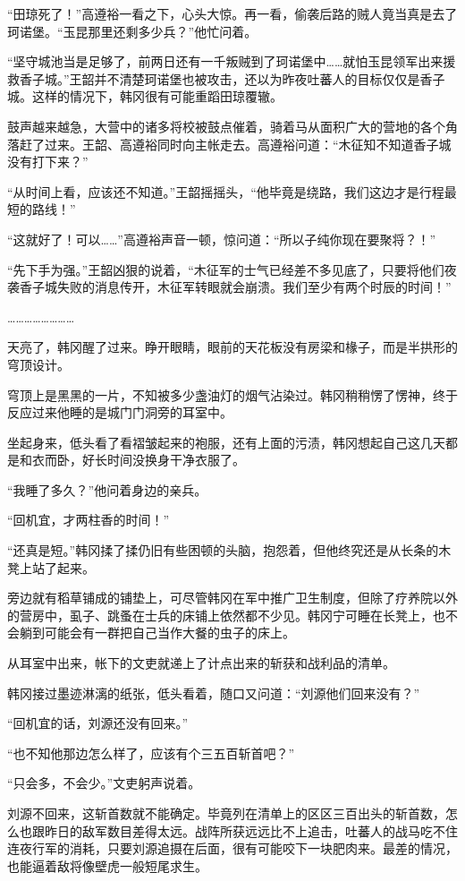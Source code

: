 “田琼死了！”高遵裕一看之下，心头大惊。再一看，偷袭后路的贼人竟当真是去了珂诺堡。“玉昆那里还剩多少兵？”他忙问着。

“坚守城池当是足够了，前两日还有一千叛贼到了珂诺堡中……就怕玉昆领军出来援救香子城。”王韶并不清楚珂诺堡也被攻击，还以为昨夜吐蕃人的目标仅仅是香子城。这样的情况下，韩冈很有可能重蹈田琼覆辙。

鼓声越来越急，大营中的诸多将校被鼓点催着，骑着马从面积广大的营地的各个角落赶了过来。王韶、高遵裕同时向主帐走去。高遵裕问道：“木征知不知道香子城没有打下来？”

“从时间上看，应该还不知道。”王韶摇摇头，“他毕竟是绕路，我们这边才是行程最短的路线！”

“这就好了！可以……”高遵裕声音一顿，惊问道：“所以子纯你现在要聚将？！”

“先下手为强。”王韶凶狠的说着，“木征军的士气已经差不多见底了，只要将他们夜袭香子城失败的消息传开，木征军转眼就会崩溃。我们至少有两个时辰的时间！”

……………………

天亮了，韩冈醒了过来。睁开眼睛，眼前的天花板没有房梁和椽子，而是半拱形的穹顶设计。

穹顶上是黑黑的一片，不知被多少盏油灯的烟气沾染过。韩冈稍稍愣了愣神，终于反应过来他睡的是城门门洞旁的耳室中。

坐起身来，低头看了看褶皱起来的袍服，还有上面的污渍，韩冈想起自己这几天都是和衣而卧，好长时间没换身干净衣服了。

“我睡了多久？”他问着身边的亲兵。

“回机宜，才两柱香的时间！”

“还真是短。”韩冈揉了揉仍旧有些困顿的头脑，抱怨着，但他终究还是从长条的木凳上站了起来。

旁边就有稻草铺成的铺垫上，可尽管韩冈在军中推广卫生制度，但除了疗养院以外的营房中，虱子、跳蚤在士兵的床铺上依然都不少见。韩冈宁可睡在长凳上，也不会躺到可能会有一群把自己当作大餐的虫子的床上。

从耳室中出来，帐下的文吏就递上了计点出来的斩获和战利品的清单。

韩冈接过墨迹淋漓的纸张，低头看着，随口又问道：“刘源他们回来没有？”

“回机宜的话，刘源还没有回来。”

“也不知他那边怎么样了，应该有个三五百斩首吧？”

“只会多，不会少。”文吏躬声说着。

刘源不回来，这斩首数就不能确定。毕竟列在清单上的区区三百出头的斩首数，怎么也跟昨日的敌军数目差得太远。战阵所获远远比不上追击，吐蕃人的战马吃不住连夜行军的消耗，只要刘源追摄在后面，很有可能咬下一块肥肉来。最差的情况，也能逼着敌将像壁虎一般短尾求生。

